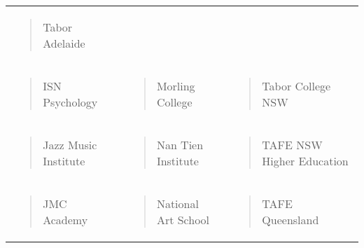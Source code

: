 \documentclass[]{book}
\begin{document}
\begin{longtable}[]{@{}lll@{}}
\begin{minipage}[t]{0.32\columnwidth}
\begin{quote}
Tabor Adelaide
\end{quote}\strut
\end{minipage}\tabularnewline
\begin{minipage}[t]{0.32\columnwidth}\raggedright
\begin{quote}
ISN Psychology
\end{quote}\strut
\end{minipage} & \begin{minipage}[t]{0.32\columnwidth}\raggedright
\begin{quote}
Morling College
\end{quote}\strut
\end{minipage} & \begin{minipage}[t]{0.32\columnwidth}\raggedright
\begin{quote}
Tabor College NSW
\end{quote}\strut
\end{minipage}\tabularnewline
\begin{minipage}[t]{0.32\columnwidth}\raggedright
\begin{quote}
Jazz Music Institute
\end{quote}\strut
\end{minipage} & \begin{minipage}[t]{0.32\columnwidth}\raggedright
\begin{quote}
Nan Tien Institute
\end{quote}\strut
\end{minipage} & \begin{minipage}[t]{0.32\columnwidth}\raggedright
\begin{quote}
TAFE NSW Higher Education
\end{quote}\strut
\end{minipage}\tabularnewline
\begin{minipage}[t]{0.32\columnwidth}\raggedright
\begin{quote}
JMC Academy
\end{quote}\strut
\end{minipage} & \begin{minipage}[t]{0.32\columnwidth}\raggedright
\begin{quote}
National Art School
\end{quote}\strut
\end{minipage} & \begin{minipage}[t]{0.32\columnwidth}\raggedright
\begin{quote}
TAFE Queensland
\end{quote}\strut

\end{minipage}
\end{longtable}
\end{document}

